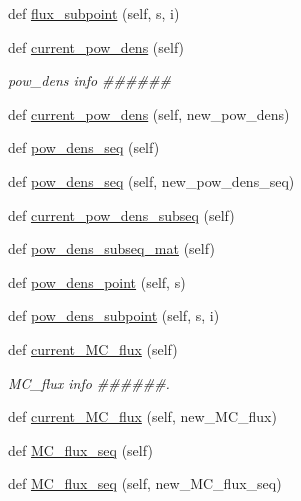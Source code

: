 \begin{DoxyCompactItemize}
\item 
def \hyperlink{classonix_1_1sequence_1_1Sequence_a8f803930e0bddcd26e986f48fa95c7b8}{flux\+\_\+subpoint} (self, s, i)
\item 
def \hyperlink{classonix_1_1sequence_1_1Sequence_a336f7f417a7ae1a62734e3729b58e25b}{current\+\_\+pow\+\_\+dens} (self)
\begin{DoxyCompactList}\small\item\em pow\+\_\+dens info \#\#\#\#\#\# \end{DoxyCompactList}\item 
def \hyperlink{classonix_1_1sequence_1_1Sequence_aceee0aa2f455aa8b86c82b8dc485832d}{current\+\_\+pow\+\_\+dens} (self, new\+\_\+pow\+\_\+dens)
\item 
def \hyperlink{classonix_1_1sequence_1_1Sequence_a230e31e518e64a65e3ea13a677dd2ca0}{pow\+\_\+dens\+\_\+seq} (self)
\item 
def \hyperlink{classonix_1_1sequence_1_1Sequence_aa357b20ca59aed435f2b17c4e88c0cb2}{pow\+\_\+dens\+\_\+seq} (self, new\+\_\+pow\+\_\+dens\+\_\+seq)
\item 
def \hyperlink{classonix_1_1sequence_1_1Sequence_a0a07c1fd565dc9e5d1e1875fedb6ee1f}{current\+\_\+pow\+\_\+dens\+\_\+subseq} (self)
\item 
def \hyperlink{classonix_1_1sequence_1_1Sequence_a85a5edc9d1b97fcc1c4b8c20aa0069b0}{pow\+\_\+dens\+\_\+subseq\+\_\+mat} (self)
\item 
def \hyperlink{classonix_1_1sequence_1_1Sequence_add32b009bcb9686326857ba0b775a455}{pow\+\_\+dens\+\_\+point} (self, s)
\item 
def \hyperlink{classonix_1_1sequence_1_1Sequence_abee5c2f993c7b1a33cefffecfc9c264d}{pow\+\_\+dens\+\_\+subpoint} (self, s, i)
\item 
def \hyperlink{classonix_1_1sequence_1_1Sequence_afddf2bf7212c5620af8955c5bff09033}{current\+\_\+\+M\+C\+\_\+flux} (self)
\begin{DoxyCompactList}\small\item\em M\+C\+\_\+flux info \#\#\#\#\#\#. \end{DoxyCompactList}\item 
def \hyperlink{classonix_1_1sequence_1_1Sequence_a03156799257935680217e9de5227cdd0}{current\+\_\+\+M\+C\+\_\+flux} (self, new\+\_\+\+M\+C\+\_\+flux)
\item 
def \hyperlink{classonix_1_1sequence_1_1Sequence_a4abda8c26332657e46bf332c76e9016d}{M\+C\+\_\+flux\+\_\+seq} (self)
\item 
def \hyperlink{classonix_1_1sequence_1_1Sequence_ac66ace90ed4548588adcc1c2dc182d61}{M\+C\+\_\+flux\+\_\+seq} (self, new\+\_\+\+M\+C\+\_\+flux\+\_\+seq)

\end{DoxyCompactItemize}

